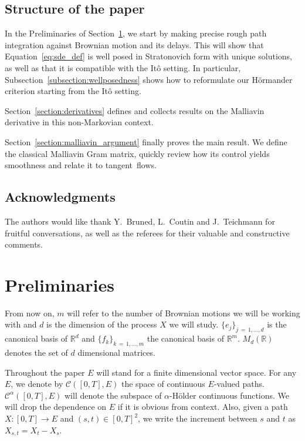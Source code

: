 \documentclass[11pt]{article}
\theoremstyle{definition}
\numberwithin{equation}{section}
\numberwithin{figure}{section}
\numberwithin{table}{section}
\newcommand*\R{\mathbb{R}}
\newcommand*\Cc{\mathcal{C}}
\begin{document}
\subsection{Structure of the paper}
In the Preliminaries of Section~\ref{section:preliminaries}, we start by making precise rough path integration against Brownian motion and its delays. This will show that Equation~\eqref{eq:sde_def} is well posed in Stratonovich form with unique solutions, as well as that it is compatible with the Itô setting. In particular, Subsection~\ref{subsection:wellposedness} shows how to reformulate our H\"ormander criterion starting from the Itô setting.

Section~\ref{section:derivatives} defines and collects results on the Malliavin derivative in this non-Markovian context.

Section~\ref{section:malliavin_argument} finally proves the main result. We define the classical Malliavin Gram matrix, quickly review how its control yields smoothness and relate it to tangent~flows.

\subsection*{Acknowledgments}
The authors would like thank Y.~Bruned, L.~Coutin and J.~Teichmann for fruitful conversations, as well as the referees for their valuable and constructive comments.

\section{Preliminaries}\label{section:preliminaries}

From now on, $m$ will refer to the number of Brownian motions we will be working with and $d$ is the dimension of the process $X$ we will study. $\{e_j\}_{j\,=\,1,\dots,d}$ is the canonical basis of $\R^d$ and $\{f_k\}_{k\,=\,1,\dots,m}$ the canonical basis of $\R^m$. $M_d(\R)$ denotes the set of $d$ dimensional matrices.

Throughout the paper $E$ will stand for a finite dimensional vector space. For any $E$, we denote by $\Cc([0,T],E)$ the space of continuous $E$-valued paths. $\Cc^\alpha([0,T],E)$ will denote the subspace of $\alpha$-H\"older continuous functions. We will drop the dependence on $E$ if it is obvious from context. Also, given a path $X:[0,T] \rightarrow E$ and $(s,t) \in [0,T]^2$, we write the increment between $s$ and $t$ as $X_{s,t} = X_t - X_s$.
\end{document}

